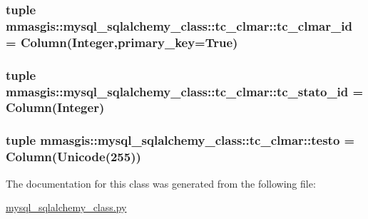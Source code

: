 \label{classmmasgis_1_1mysql__sqlalchemy__class_1_1tc__clmar_ae8d16cca495cf5cc4bad505683b19f7e}
\hypertarget{classmmasgis_1_1mysql__sqlalchemy__class_1_1tc__clmar_a4b74212398af7e631309d7d8f7a2c148}{
\subsubsection[{tc\_\-clmar\_\-id}]{\setlength{\rightskip}{0pt plus 5cm}tuple {\bf mmasgis::mysql\_\-sqlalchemy\_\-class::tc\_\-clmar::tc\_\-clmar\_\-id} = Column(Integer,primary\_\-key=True)}}
\label{classmmasgis_1_1mysql__sqlalchemy__class_1_1tc__clmar_a4b74212398af7e631309d7d8f7a2c148}
\hypertarget{classmmasgis_1_1mysql__sqlalchemy__class_1_1tc__clmar_a32c42b16d1855f84df5b919b956b0558}{
\subsubsection[{tc\_\-stato\_\-id}]{\setlength{\rightskip}{0pt plus 5cm}tuple {\bf mmasgis::mysql\_\-sqlalchemy\_\-class::tc\_\-clmar::tc\_\-stato\_\-id} = Column(Integer)}}
\label{classmmasgis_1_1mysql__sqlalchemy__class_1_1tc__clmar_a32c42b16d1855f84df5b919b956b0558}
\hypertarget{classmmasgis_1_1mysql__sqlalchemy__class_1_1tc__clmar_a7633692dc0b9210daa5c8875c68936bc}{
\subsubsection[{testo}]{\setlength{\rightskip}{0pt plus 5cm}tuple {\bf mmasgis::mysql\_\-sqlalchemy\_\-class::tc\_\-clmar::testo} = Column(Unicode(255))}}
\label{classmmasgis_1_1mysql__sqlalchemy__class_1_1tc__clmar_a7633692dc0b9210daa5c8875c68936bc}


The documentation for this class was generated from the following file:\begin{DoxyCompactItemize}
\item 
\hyperlink{mysql__sqlalchemy__class_8py}{mysql\_\-sqlalchemy\_\-class.py}\end{DoxyCompactItemize}

